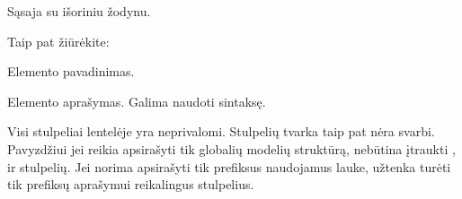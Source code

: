 \documentclass[letterpaper,10pt,lithuanian]{sphinxmanual}
\begin{document}

\begin{fulllineitems}
\label{\detokenize{formatas:uri}}
\pysigstartsignatures
{}
\pysigstopsignatures
\sphinxAtStartPar
{}

\sphinxAtStartPar
Sąsaja su išoriniu žodynu.


\begin{sphinxseealso}{Taip pat žiūrėkite:}

\sphinxAtStartPar
{\hyperref[\detokenize{zodynai:vocab}]{}}


\end{sphinxseealso}


\end{fulllineitems}


\begin{fulllineitems}
\label{\detokenize{formatas:title}}
\pysigstartsignatures
{}
\pysigstopsignatures
\sphinxAtStartPar
{}

\sphinxAtStartPar
Elemento pavadinimas.

\end{fulllineitems}


\begin{fulllineitems}
\label{\detokenize{formatas:description}}
\pysigstartsignatures
{}
\pysigstopsignatures
\sphinxAtStartPar
{}

\sphinxAtStartPar
Elemento aprašymas. Galima naudoti  sintaksę.

\end{fulllineitems}


\sphinxAtStartPar
Visi stulpeliai lentelėje yra neprivalomi. Stulpelių tvarka taip pat nėra
svarbi. Pavyzdžiui jei reikia apsirašyti tik globalių modelių struktūrą,
nebūtina įtraukti {\hyperref[\detokenize{formatas:dataset}]{}}, {\hyperref[\detokenize{formatas:resource}]{}} ir {\hyperref[\detokenize{formatas:base}]{}} stulpelių.
Jei norima apsirašyti tik prefiksus naudojamus {\hyperref[\detokenize{formatas:uri}]{}} lauke, užtenka
turėti tik prefiksų aprašymui reikalingus stulpelius.
\end{document}

